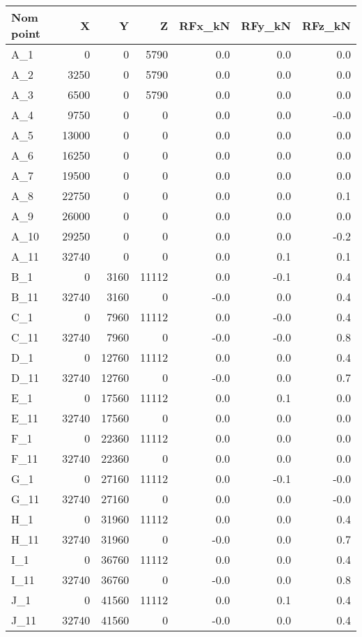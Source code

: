 \begin{tabular}{lrrrrrr}
\toprule
Nom point & X & Y & Z & RFx\_kN & RFy\_kN & RFz\_kN \\
\midrule
A\_1 & 0 & 0 & 5790 & 0.0 & 0.0 & 0.0 \\
A\_2 & 3250 & 0 & 5790 & 0.0 & 0.0 & 0.0 \\
A\_3 & 6500 & 0 & 5790 & 0.0 & 0.0 & 0.0 \\
A\_4 & 9750 & 0 & 0 & 0.0 & 0.0 & -0.0 \\
A\_5 & 13000 & 0 & 0 & 0.0 & 0.0 & 0.0 \\
A\_6 & 16250 & 0 & 0 & 0.0 & 0.0 & 0.0 \\
A\_7 & 19500 & 0 & 0 & 0.0 & 0.0 & 0.0 \\
A\_8 & 22750 & 0 & 0 & 0.0 & 0.0 & 0.1 \\
A\_9 & 26000 & 0 & 0 & 0.0 & 0.0 & 0.0 \\
A\_10 & 29250 & 0 & 0 & 0.0 & 0.0 & -0.2 \\
A\_11 & 32740 & 0 & 0 & 0.0 & 0.1 & 0.1 \\
B\_1 & 0 & 3160 & 11112 & 0.0 & -0.1 & 0.4 \\
B\_11 & 32740 & 3160 & 0 & -0.0 & 0.0 & 0.4 \\
C\_1 & 0 & 7960 & 11112 & 0.0 & -0.0 & 0.4 \\
C\_11 & 32740 & 7960 & 0 & -0.0 & -0.0 & 0.8 \\
D\_1 & 0 & 12760 & 11112 & 0.0 & 0.0 & 0.4 \\
D\_11 & 32740 & 12760 & 0 & -0.0 & 0.0 & 0.7 \\
E\_1 & 0 & 17560 & 11112 & 0.0 & 0.1 & 0.0 \\
E\_11 & 32740 & 17560 & 0 & 0.0 & 0.0 & 0.0 \\
F\_1 & 0 & 22360 & 11112 & 0.0 & 0.0 & 0.0 \\
F\_11 & 32740 & 22360 & 0 & 0.0 & 0.0 & 0.0 \\
G\_1 & 0 & 27160 & 11112 & 0.0 & -0.1 & -0.0 \\
G\_11 & 32740 & 27160 & 0 & 0.0 & 0.0 & -0.0 \\
H\_1 & 0 & 31960 & 11112 & 0.0 & 0.0 & 0.4 \\
H\_11 & 32740 & 31960 & 0 & -0.0 & 0.0 & 0.7 \\
I\_1 & 0 & 36760 & 11112 & 0.0 & 0.0 & 0.4 \\
I\_11 & 32740 & 36760 & 0 & -0.0 & 0.0 & 0.8 \\
J\_1 & 0 & 41560 & 11112 & 0.0 & 0.1 & 0.4 \\
J\_11 & 32740 & 41560 & 0 & -0.0 & 0.0 & 0.4 \\

\end{tabular}
